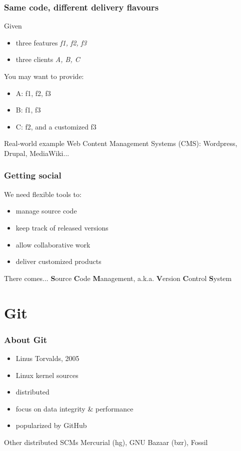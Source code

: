 \documentclass{beamer}
\begin{document}
\begin{frame}
  \frametitle{Same code, different delivery flavours}

  Given
  \begin{itemize}
    \item three features \textit{f1, f2, f3}
    \item three clients \textit{A, B, C}
  \end{itemize}
  \pause
  You may want to provide:
  \pause
  \begin{itemize}[<+->]
    \item A: f1, f2, f3
    \item B: f1, f3
    \item C: f2, and a customized f3
  \end{itemize}
  \pause
  \begin{exampleblock}{Real-world example}
    Web Content Management Systems (CMS): Wordpress, Drupal, MediaWiki...
  \end{exampleblock}
\end{frame}

\begin{frame}
  \frametitle{Getting social}

  We need flexible tools to:
  \pause
  \begin{itemize}[<+->]
    \item manage source code
    \item keep track of released versions
    \item allow collaborative work
    \item deliver customized products
  \end{itemize}
  \pause
  \begin{block}{There comes...}
    \textbf{S}ource \textbf{C}ode \textbf{M}anagement,
    a.k.a. \textbf{V}ersion \textbf{C}ontrol \textbf{S}ystem
  \end{block}
\end{frame}

\section{Git}
\begin{frame}
  \frametitle{About Git}
  \begin{itemize}[<+->]
    \item Linus Torvalds, 2005
    \item Linux kernel sources
    \item distributed
    \item focus on data integrity \& performance
    \item popularized by GitHub
  \end{itemize}
  \pause
  \begin{block}{Other distributed SCMs}
    Mercurial (hg), GNU Bazaar (bzr), Fossil
  \end{block}
\end{frame}
\end{document}
